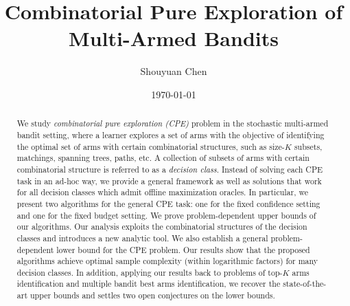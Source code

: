 \documentclass{article}
\title{Combinatorial Pure Exploration of \\ Multi-Armed Bandits}
\author{Shouyuan Chen}
\date{\today}
\newcommand{\wei}[1]{}
\newcommand{\wei}[1]{{\color{blue!50!black}  [\text{Wei:} #1]}}
\newcommand{\Problem}{{CPE}\xspace}
\begin{document}
\newpage

\maketitle
\vspace{-1em}
\begin{abstract}
We study {\em combinatorial pure exploration (\Problem)} problem in the stochastic multi-armed bandit setting,
	where a learner explores a set of arms with the objective of identifying the optimal set of arms
	with certain combinatorial structures, such as size-$K$ subsets, matchings, spanning trees,
	paths, etc.
A collection of subsets of arms with certain combinatorial structure is referred to as a {\em decision class}.	
Instead of solving each \Problem task in an ad-hoc way, we provide a general framework
	as well as solutions that work for all decision classes which admit offline maximization oracles.  
In particular, we present two algorithms for the general \Problem task: 
	one for the fixed confidence setting and one for the fixed budget setting.
We prove problem-dependent upper bounds of our algorithms. 
Our analysis exploits the combinatorial structures of the decision classes and introduces a new analytic tool.
We also establish a general problem-dependent lower bound for the \Problem problem.
Our results show that the proposed algorithms achieve optimal sample complexity (within logarithmic factors) for many decision classes. 
In addition, applying our results back to problems of top-$K$ arms identification and multiple bandit best arms identification, we recover the state-of-the-art upper bounds and settles two open conjectures on the lower bounds.





\end{abstract}
\end{document}
